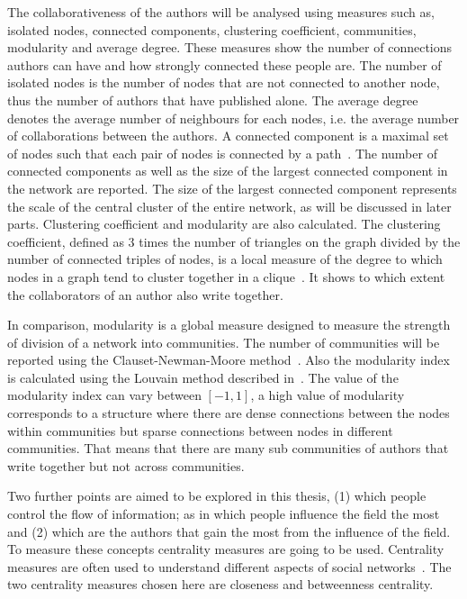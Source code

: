 The collaborativeness of the authors will be analysed using measures such as, isolated nodes,
connected components, clustering coefficient, communities, modularity and average degree.
These measures show the number of connections authors can have
and how strongly connected these people are. The number of isolated nodes is the
number of nodes that are not connected to another node, thus the
number of authors that have published alone. The average degree denotes the average
number of neighbours for each nodes, i.e. the average number of collaborations
between the authors.
A connected component is a maximal set of nodes such that each pair of nodes is
connected by a path~\cite{Easley2010}. The number of connected components as well as the size of the
largest connected component in the network are reported.
The size of the largest connected component represents the scale of the central cluster
of the entire network, as will be discussed in later parts.
Clustering coefficient and modularity are also calculated. The clustering
coefficient, defined as 3 times the number of triangles on the graph divided
by the number of connected triples of nodes, is a local measure of the degree to
which nodes in a graph tend to cluster together
in a clique~\cite{Easley2010}. It shows to which extent the collaborators
of an author also write together.

In comparison, modularity is a global measure designed to measure the strength of
division of a network into communities. The number of communities will be reported
using the Clauset-Newman-Moore method~\cite{clauset2004}. Also the modularity index
is calculated using the Louvain method described in~\cite{Blondel2008}. The value
of the modularity index can vary between \([-1, 1]\), a high value of modularity
corresponds to a structure where there are dense connections between the nodes within
communities but sparse connections between nodes in different communities.
That means that there are many sub communities of authors that write together
but not across communities.

Two further points are aimed to be explored in this thesis, (1) which people control the flow
of information;
as in which people influence the field the most and (2) which are the authors that
gain the most from the influence of the field. To measure these concepts
centrality measures are going to be used.
Centrality measures are often used to understand different
aspects of social networks~\cite{Landherr2010}. The two centrality measures chosen
here are closeness and betweenness centrality.

